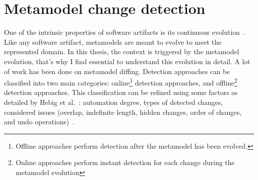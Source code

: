  \section{Metamodel change detection}
 \label{changedetection}
 One of the intrinsic properties of software artifacts is its continuous evolution~\cite{mens2008introduction}. Like any software artifact, metamodels are meant to evolve to meet the represented domain. %
 In this thesis, the context is triggered by the metamodel evolution, that's why I find essential to understand this evolution in detail.
 A lot of work has been done on metamodel diffing.
 Detection approaches can be classified into two main categories: online\footnote{Offline approaches perform detection after the metamodel has been evolved.} detection approaches, and offline\footnote{Online approaches perform instant detection for each change during the metamodel evolution} detection approaches. This classification can be refined using some factors as detailed by Hebig et al.~\cite{hebig2016approaches}: automation degree, types of detected changes, considered issues (overlap, indefinite length, hidden changes, order of changes, and undo operations)~\cite{hebig2016approaches}.
 	
 
 
